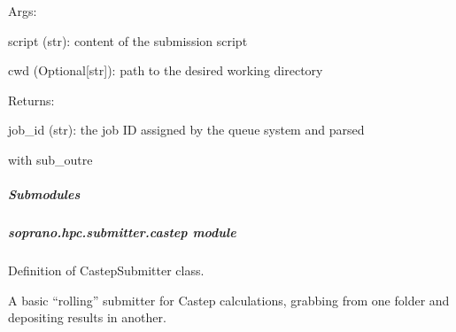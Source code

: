 \documentclass[letterpaper,10pt,english]{sphinxmanual}
\begin{document}
\begin{fulllineitems}
\begin{fulllineitems}
\begin{DUlineblock}{0em}
\item[] Args:
\item[]
\begin{DUlineblock}{\DUlineblockindent}
\item[] script (str): content of the submission script
\item[] cwd (Optional{[}str{]}): path to the desired working directory
\item[] 
\end{DUlineblock}
\item[] Returns:
\item[]
\begin{DUlineblock}{\DUlineblockindent}
\item[] job\_id (str): the job ID assigned by the queue system and parsed
\item[]
\begin{DUlineblock}{\DUlineblockindent}
\item[] with sub\_outre
\end{DUlineblock}
\end{DUlineblock}
\end{DUlineblock}

\end{fulllineitems}


\end{fulllineitems}



\subparagraph{Submodules}
\label{doctree/soprano.hpc.submitter:submodules}

\subparagraph{soprano.hpc.submitter.castep module}
\label{doctree/soprano.hpc.submitter.castep:module-soprano.hpc.submitter.castep}\label{doctree/soprano.hpc.submitter.castep::doc}\label{doctree/soprano.hpc.submitter.castep:soprano-hpc-submitter-castep-module}
Definition of CastepSubmitter class.

A basic ``rolling'' submitter for Castep calculations, grabbing from one folder
and depositing results in another.
\end{document}
